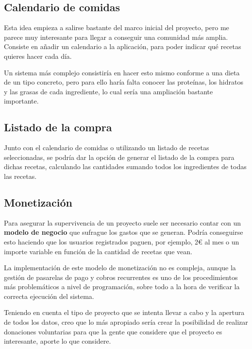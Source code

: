 \subsection{Calendario de comidas}

Esta idea empieza a salirse bastante del marco inicial del proyecto, pero me
parece muy interesante para llegar a conseguir una comunidad más amplia.
Consiste en añadir un calendario a la aplicación, para poder indicar qué
recetas quieres hacer cada día.

Un sistema más complejo consistiría en hacer esto mismo conforme a una dieta
de un tipo concreto, pero para ello haría falta conocer las proteínas, los
hidratos y las grasas de cada ingrediente, lo cual sería una ampliación bastante
importante.


\subsection{Listado de la compra}

Junto con el calendario de comidas o utilizando un listado de recetas
seleccionadas, se podría dar la opción de generar el listado de la compra para
dichas recetas, calculando las cantidades sumando todos los ingredientes de todas
las recetas.


\subsection{Monetización}

Para asegurar la supervivencia de un proyecto suele ser necesario contar con un
\textbf{modelo de negocio} que sufrague los gastos que se generan. Podría
conseguirse esto haciendo que los usuarios registrados paguen, por ejemplo, 2€
al mes o un importe variable en función de la cantidad de recetas que vean.

La implementación de este modelo de monetización no es compleja, aunque la
gestión de pasarelas de pago y cobros recurrentes es uno de los procedimientos
más problemáticos a nivel de programación, sobre todo a la hora de verificar la
correcta ejecución del sistema.

Teniendo en cuenta el tipo de proyecto que se intenta llevar a cabo y la
apertura de todos los datos, creo que lo más apropiado sería crear la
posibilidad de realizar donaciones voluntarias para que la gente que considere
que el proyecto es interesante, aporte lo que considere.
